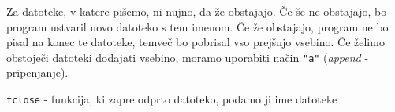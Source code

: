 \documentclass{article}
\begin{document}
Za datoteke, v katere pišemo, ni nujno, da že obstajajo. Če še ne obstajajo, bo
program ustvaril novo datoteko s tem imenom. Če že obstajajo, program ne bo
pisal na konec te datoteke, temveč bo pobrisal vso prejšnjo vsebino.
Če želimo obstoječi datoteki dodajati vsebino, moramo uporabiti način
\verb+"a"+ (\emph{append} - pripenjanje).

\verb+fclose+ - funkcija, ki zapre odprto datoteko, podamo ji ime datoteke
\end{document}

